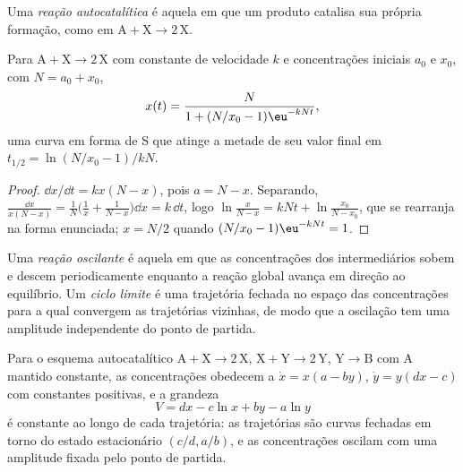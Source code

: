 \begin{definition}\label{def:b3:complex-kinetics:autocatalysis}
Uma \emph{reação autocatalítica} é aquela em que
um produto catalisa sua própria formação, como em $\mathrm{A + X \to 2\,X}$.
\end{definition}

\begin{proposition}\label{prop:b3:complex-kinetics:logistic}
Para $\mathrm{A + X \to 2\,X}$ com constante de velocidade $k$ e concentrações iniciais $a_0$ e $x_0$,
com $N = a_0 + x_0$,
\[
  x(t) = \frac{N}{1 + (N/x_0 - 1)\eu^{-kNt}},
\]
uma curva em forma de S que atinge a metade de seu valor final em $t_{1/2} = \ln(N/x_0 - 1)/kN$.
\end{proposition}

\begin{proof}
$\dd x/\dd t = kx(N - x)$, pois $a = N - x$. Separando, $\frac{\dd x}{x(N - x)} = \frac1N\bigl(\frac1x + \frac{1}{N - x}\bigr)\dd x
= k\,\dd t$, logo $\ln\frac{x}{N - x} = kNt + \ln\frac{x_0}{N - x_0}$, que se rearranja na forma enunciada;
$x = N/2$ quando $(N/x_0 - 1)\eu^{-kNt} = 1$.
\end{proof}

\begin{definition}\label{def:b3:complex-kinetics:oscillating}
Uma \emph{reação oscilante} é aquela em que as
concentrações dos intermediários sobem e descem periodicamente enquanto a reação
global avança em direção ao equilíbrio. Um \emph{ciclo limite} é
uma trajetória fechada no espaço das concentrações para a qual convergem as
trajetórias vizinhas, de modo que a oscilação tem uma amplitude independente do
ponto de partida.
\end{definition}

\begin{theorem}\label{thm:b3:complex-kinetics:lotka-volterra}
Para o esquema autocatalítico $\mathrm{A + X \to 2\,X}$, $\mathrm{X + Y \to 2\,Y}$, $\mathrm{Y \to B}$ com A mantido
constante, as concentrações obedecem a $\dot x = x(a - by)$, $\dot y = y(dx - c)$ com
constantes positivas, e a grandeza
\[
  V = dx - c\ln x + by - a\ln y
\]
é constante ao longo de cada trajetória: as trajetórias são curvas fechadas em torno
do estado estacionário $(c/d, a/b)$, e as concentrações oscilam com uma
amplitude fixada pelo ponto de partida.
\end{theorem}

